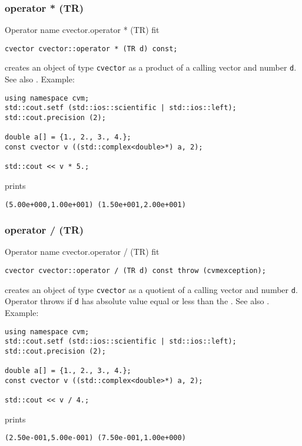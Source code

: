 \subsubsection{operator * (TR)}
Operator%
\pdfdest name {cvector.operator * (TR)} fit
\begin{verbatim}
cvector cvector::operator * (TR d) const;
\end{verbatim}
creates an object of type \verb"cvector" as a product of
a calling  vector and  number \verb"d".
See also .
Example:
\begin{Verbatim}
using namespace cvm;
std::cout.setf (std::ios::scientific | std::ios::left);
std::cout.precision (2);

double a[] = {1., 2., 3., 4.};
const cvector v ((std::complex<double>*) a, 2);

std::cout << v * 5.;
\end{Verbatim}
prints
\begin{Verbatim}
(5.00e+000,1.00e+001) (1.50e+001,2.00e+001)
\end{Verbatim}
\newpage



\subsubsection{operator / (TR)}
Operator%
\pdfdest name {cvector.operator / (TR)} fit
\begin{verbatim}
cvector cvector::operator / (TR d) const throw (cvmexception);
\end{verbatim}
creates an object of type \verb"cvector" as a quotient of
a calling  vector and  number \verb"d". Operator throws
if \verb"d" has  absolute value equal or less
than the
.
See also .
Example:
\begin{Verbatim}
using namespace cvm;
std::cout.setf (std::ios::scientific | std::ios::left);
std::cout.precision (2);

double a[] = {1., 2., 3., 4.};
const cvector v ((std::complex<double>*) a, 2);

std::cout << v / 4.;
\end{Verbatim}
prints
\begin{Verbatim}
(2.50e-001,5.00e-001) (7.50e-001,1.00e+000)
\end{Verbatim}
\newpage



